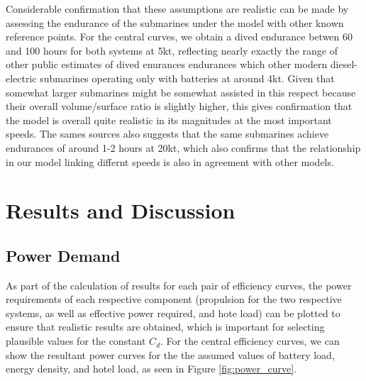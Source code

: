 \documentclass{article}\usepackage[]{graphicx}\usepackage[]{color}
\begin{document}
Considerable confirmation that these assumptions are realistic can be made by assessing the endurance of the submarines under the model with other known reference points.  For the central curves, we obtain a dived endurance betwen 60 and 100 hours for both systems at 5kt, reflecting nearly exactly the range of other public estimates of dived enurances endurances which other modern diesel-electric submarines operating only with batteries \parencite[3]{buckingham2008submarine} at around 4kt.  Given that somewhat larger submarines might be somewhat assisted in this respect because their overall volume/surface ratio is slightly higher, this gives confirmation that the model is overall quite realistic in its magnitudes at the most important speeds.  The sames sources also suggests that the same submarines achieve endurances of around 1-2 hours at 20kt, which also confirms that the relationship in our model linking differnt speeds is also in agreement with other models.

\newpage  \section{Results and Discussion}

\subsection{Power Demand}
As part of the calculation of results for each pair of efficiency curves, the power requirements of each respective component (propulsion for the two respective systems, as well as effective power required, and hote load) can be plotted to ensure that realistic results are obtained, which is important for selecting plausible values for the constant $C_d$.  For the central efficiency curves, we can show the resultant power curves for the the assumed values of battery load, energy density, and hotel load, as seen in Figure \ref{fig:power_curve}.
\end{document}
